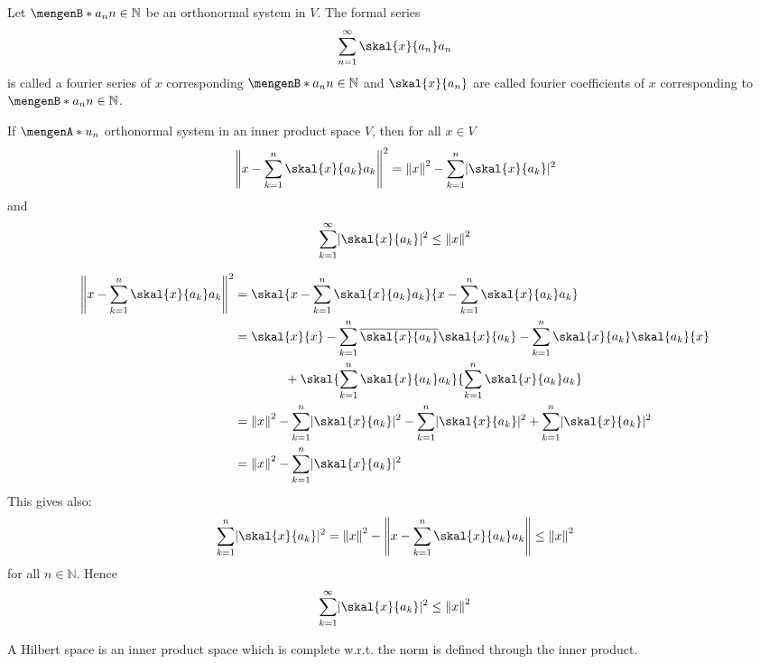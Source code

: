 \begin{definition}
	Let $\set[a_n]{n \in \mathbb{N}}$ be an orthonormal system in $V$. The formal series 
	\[
		\sum_{n=1}^{\infty} \skal{x}{a_n}a_n
	\]
	is called a fourier series of $x$ corresponding $\set[a_n]{n \in \mathbb{N}}$ and $\skal{x}{a_n}$ are called fourier coefficients of $x$ corresponding to $\set[a_n]{n \in \mathbb{N}}$. 
\end{definition}

\begin{theorem}
	If $\set{u_n}$ orthonormal system in an inner product space $V$, then for all $x \in V$
	\[
		\norm{x- \sum_{k=1}^{n} \skal{x}{a_k}a_k}^2 = \norm{x}^2 - \sum_{k=1}^{n} \abs{\skal{x}{a_k}}^2
	\]
	and 
	\[
		\sum_{k=1}^{\infty} \abs{\skal{x}{a_k}}^2 \leq \norm{x}^2
	\]
\end{theorem}
\begin{beweis}
	\begin{align*}
		\norm{x- \sum_{k=1}^{n} \skal{x}{a_k}a_k}^2 &= \skal{x- \sum_{k=1}^{n} \skal{x}{a_k}a_k }{x - \sum_{k=1}^{n} \skal{x}{a_k}a_k} \\
		&= \skal{x}{x} - \sum_{k=1}^{n} \overline{\skal{x}{a_k}} \skal{x}{a_k} - \sum_{k=1}^{n} \skal{x}{a_k}\skal{a_k}{x} 
		\\ & \qquad \qquad + \skal{\sum_{k=1}^{n}\skal{x}{a_k}a_k}{\sum_{k=1}^{n}\skal{x}{a_k}a_k} \\
		& = \norm{x}^2 - \sum_{k=1}^{n} \abs{\skal{x}{a_k}}^2 - \sum_{k=1}^{n} \abs{\skal{x}{a_k}}^2 + \sum_{k=1}^{n}\abs{\skal{x}{a_k}}^2  \\
		& = \norm{x}^2 - \sum_{k=1}^{n} \abs{\skal{x}{a_k}}^2
	\end{align*}
	This gives also:
	\[
		\sum_{k=1}^{n}\abs{\skal{x}{a_k}}^2 = \norm{x}^2 - \norm{x - \sum_{k=1}^{n} \skal{x}{a_k}a_k} \leq \norm{x}^2 
	\]
	for all $n \in \mathbb{N}$. Hence
	\[
		\sum_{k=1}^{\infty} \abs{\skal{x}{a_k}}^2 \leq \norm{x}^2
	\]
\end{beweis}

\begin{definition}
	A Hilbert space is an inner product space which is complete w.r.t. the norm is defined through the inner product.
\end{definition}

